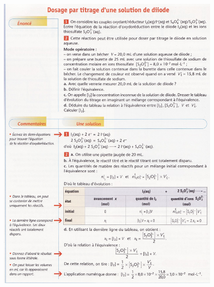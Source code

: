 \documentclass[11pt,a4paper]{article}
\begin{document}
\begin{figure}[h]
    \centering
    \includegraphics[width=\linewidth]{imgs/c1/xo5.jpg}
\end{figure} 
\end{document}
